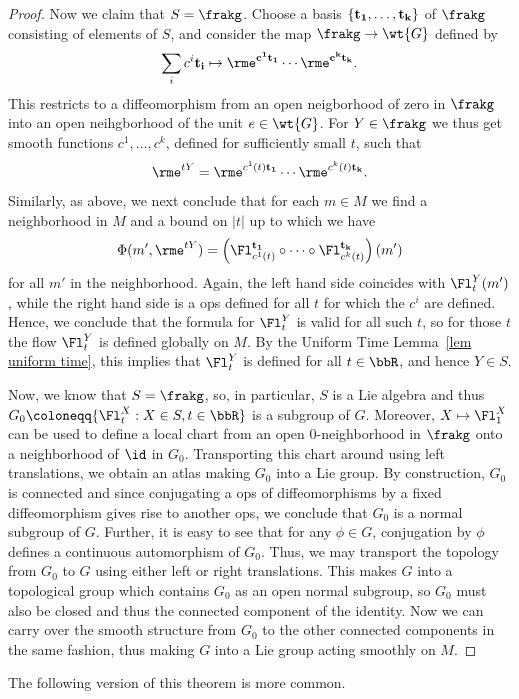 \begin{proof}
    Now we claim that $S=\frakg$. Choose a basis $\{\bf{t}_1,\ldots,\bf{t}_k\}$ of $\frakg$ consisting of elements of $S$, and consider the map $\frakg\to \wt{G}$ defined by 
    \[\sum_i c^i \bf{t}_i\mapsto \rme^{c^1\bf{t}_1}\cdots\rme^{c^k\bf{t}_k}.\]
    This restricts to a diffeomorphism from an open neigborhood of zero in $\frakg$ into an open neihgborhood of the unit $e\in \wt{G}$. For $Y\in\frakg$ we thus get smooth functions $c^1,\ldots,c^k$, defined for sufficiently small $t$, such that 
    \[\rme^{tY}=\rme^{c^1(t)\bf{t}_1}\cdots\rme^{c^k(t)\bf{t}_k}.\]
    Similarly, as above, we next conclude that for each $m\in M$ we find a neighborhood in $M$ and a bound on $|t|$ up to which we have 
    \[\Phi(m',\rme^{tY})=\left(\Fl_{c^1(t)}^{\bf{t}_1}\circ\cdots\circ \Fl_{c^k(t)}^{\bf{t}_k}\right)(m')\]
    for all $m'$ in the neighborhood. Again, the left hand side coincides with $\Fl_t^Y(m')$, while the right hand side is a \gls{ops} defined for all $t$ for which the $c^i$ are defined. Hence, we conclude that the formula for $\Fl^Y_t$ is valid for all such $t$, so for those $t$ the flow $\Fl^Y_t$ is defined globally on $M$. By the Uniform Time Lemma~\ref{lem uniform time}, this implies that $\Fl_t^Y$ is defined for all $t\in \bbR$, and hence $Y\in S$.

    Now, we know that $S=\frakg$, so, in particular, $S$ is a Lie algebra and thus $G_0\coloneqq \{\Fl_t^X:X\in S,t\in\bbR\}$ is a subgroup of $G$. Moreover, $X\mapsto \Fl_1^X$ can be used to define a local chart from an open $0$-neighborhood in $\frakg$ onto a neighborhood of $\id$ in $G_0$. Transporting this chart around using left translations, we obtain an atlas making $G_0$ into a Lie group. By construction, $G_0$ is connected and since conjugating a \gls{ops} of diffeomorphisms by a fixed diffeomorphism gives rise to another \gls{ops}, we conclude that $G_0$ is a normal subgroup of $G$. Further, it is easy to see that for any $\phi\in G$, conjugation by $\phi$ defines a continuous automorphism of $G_0$. Thus, we may transport the topology from $G_0$ to $G$ using either left or right translations. This makes $G$ into a topological group which contains $G_0$ as an open normal subgroup, so $G_0$ must also be closed and thus the connected component of the identity. Now we can carry over the smooth structure from $G_0$ to the other connected components in the same fashion, thus making $G$ into a Lie group acting smoothly on $M$.
\end{proof}

The following version of this theorem is more common.

